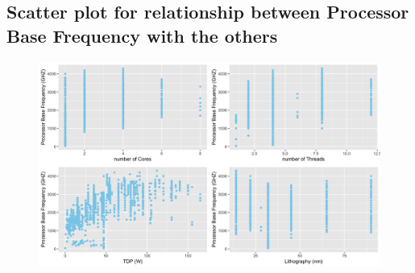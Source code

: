 \subsection{Scatter plot for relationship between Processor Base Frequency with the others}
\begin{figure}[H]
    \begin{center}
    \includegraphics[width=14cm]{graphics/scatter.png}
    \end{center}
\end{figure}

